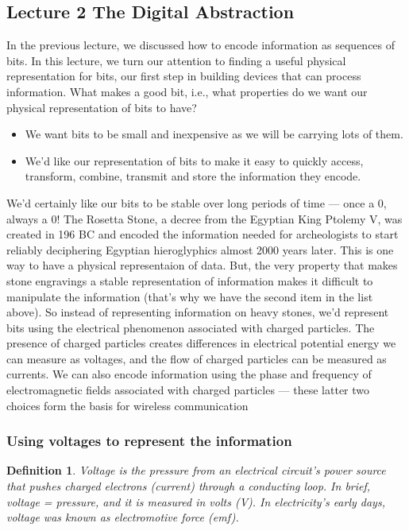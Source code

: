 \documentclass[a4paper,twoside]{article}
\newtheorem{definition}[theorem]{Definition}
\numberwithin{equation}{section}
\begin{document}
\subsection{Lecture 2 The Digital Abstraction}
In the previous lecture, we discussed how to encode information as sequences of bits. In this lecture,
we turn our attention to finding a useful physical representation for bits, our first step in building
devices that can process information. \newline
What makes a good bit, i.e., what properties do we want our physical representation of bits to have?
\begin{itemize}
    \item We want bits to be small and inexpensive as we will be carrying lots of them.
    \item We'd like our representation of bits to make it easy to quickly access, transform, combine,
          transmit and store the information they encode.
\end{itemize}
We'd certainly like our bits to be stable over long periods of time — once a 0, always a 0!
The Rosetta Stone, a decree from the Egyptian King Ptolemy V, was created in 196 BC and encoded the
information needed for archeologists to start reliably deciphering Egyptian hieroglyphics almost 2000
years later. This is one way to have a physical representaion of data. But, the very property that
makes stone engravings a stable representation of information makes it difficult to manipulate the
information (that's why we have the second item in the list above). So instead of representing
information on heavy stones, we'd  represent bits using the electrical phenomenon associated
with charged particles.  The presence of charged particles creates differences in electrical
potential energy we can measure as voltages, and the flow of charged particles can be measured
as currents. We can also encode information using the phase and frequency of electromagnetic
fields associated with charged particles — these latter two choices form the basis for wireless
communication
\subsubsection{Using voltages to represent the information}
\begin{definition}
    Voltage is the pressure from an electrical circuit's power source that pushes charged electrons
    (current) through a conducting loop. In brief, voltage = pressure, and it is measured in volts (V).
    In electricity's early days, voltage was known as electromotive force (emf).
\end{definition}
\end{document}
